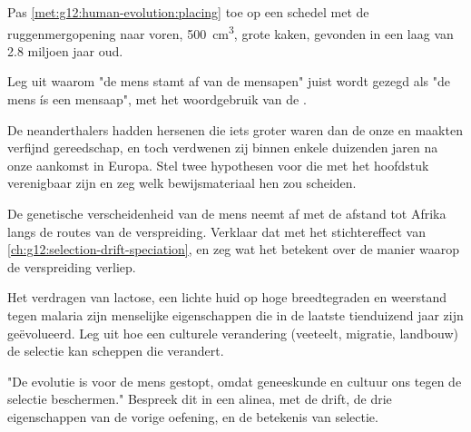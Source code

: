 \begin{exercise}[$\star\star$]\label{exo:g12:human-evolution:10}
Pas \cref{met:g12:human-evolution:placing} toe op een schedel met de
ruggenmergopening naar voren, \qty{500}{cm^3}, grote kaken, gevonden in
een laag van 2.8 miljoen jaar oud.
\end{exercise}

\begin{exercise}[$\star\star$]\label{exo:g12:human-evolution:11}
Leg uit waarom "de mens stamt af van de mensapen" juist wordt gezegd als
"de mens ís een mensaap", met het woordgebruik van de .
\end{exercise}

\begin{exercise}[$\star\star\star$]\label{exo:g12:human-evolution:12}
De neanderthalers hadden hersenen die iets groter waren dan de onze en
maakten verfijnd gereedschap, en toch verdwenen zij binnen enkele duizenden
jaren na onze aankomst in Europa. Stel twee hypothesen voor die met het
hoofdstuk verenigbaar zijn en zeg welk bewijsmateriaal hen zou scheiden.
\end{exercise}

\begin{exercise}[$\star\star\star$]\label{exo:g12:human-evolution:13}
De genetische verscheidenheid van de mens neemt af met de afstand tot
Afrika langs de routes van de verspreiding. Verklaar dat met het
stichtereffect van \cref{ch:g12:selection-drift-speciation}, en zeg wat
het betekent over de manier waarop de verspreiding verliep.
\end{exercise}

\begin{exercise}[$\star\star\star$]\label{exo:g12:human-evolution:14}
Het verdragen van lactose, een lichte huid op hoge breedtegraden en
weerstand tegen malaria zijn menselijke eigenschappen die in de laatste
tienduizend jaar zijn geëvolueerd. Leg uit hoe een culturele verandering
(veeteelt, migratie, landbouw) de selectie kan scheppen die 
verandert.
\end{exercise}

\begin{exercise}[$\star\star\star$]\label{exo:g12:human-evolution:15}
"De evolutie is voor de mens gestopt, omdat geneeskunde en cultuur ons
tegen de selectie beschermen." Bespreek dit in een alinea, met de drift,
de drie eigenschappen van de vorige oefening, en de betekenis van
selectie.
\end{exercise}

